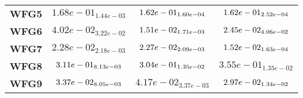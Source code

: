\documentclass{article}
\begin{document}
\begin{table}[!htp]
\begin{scriptsize}
\begin{tabular}{c|ccc}
      \textbf{WFG5} & $1.68e-01_{1.44e-03} $ & $ \cellcolor{gray95} 1.62e-01_{1.60e-04} $ & $ \cellcolor{gray25} 1.62e-01_{2.52e-04}$ \\
      \textbf{WFG6} & $4.02e-02_{3.22e-02} $ & $ \cellcolor{gray95} 1.51e-02_{1.71e-03} $ & $ \cellcolor{gray25} 2.45e-02_{4.06e-02}$ \\
      \textbf{WFG7} & $2.28e-02_{2.18e-03} $ & $ \cellcolor{gray25} 2.27e-02_{2.09e-03} $ & $ \cellcolor{gray95} 1.52e-02_{1.63e-04}$ \\
      \textbf{WFG8} & $\cellcolor{gray25} 3.11e-01_{8.13e-03} $ & $ \cellcolor{gray95} 3.04e-01_{1.35e-02} $ & $ 3.55e-01_{1.35e-02}$ \\
      \textbf{WFG9} & $\cellcolor{gray25} 3.37e-02_{8.05e-03} $ & $ 4.17e-02_{3.37e-03} $ & $ \cellcolor{gray95} 2.97e-02_{1.34e-02}$ \\
  \end{tabular}
  \end{scriptsize}
\end{table}
\end{document}
